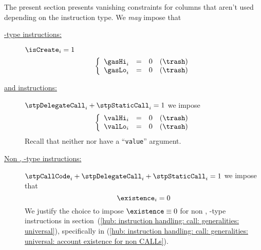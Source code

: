 The present section presents vanishing constraints for columns that aren't used depending on the instruction type. We \emph{may} impose that
\begin{description}
	\item[\underline{-type instructions:}] \If $\isCreate_{i} = 1$ \Then
		\[
			\left\{\begin{array}{lclr}
				\gasHi     _{i} & = & 0 & (\trash) \\
				\gasLo     _{i} & = & 0 & (\trash) \\
			\end{array}\right.
		\]
	\item[\underline{ and  instructions:}]
		\If $\stpDelegateCall _{i} + \stpStaticCall _{i} = 1$
		\Then we impose
		\[
			\left\{\begin{array}{lclr}
				\valHi _{i} & = & 0 & (\trash) \\
				\valLo _{i} & = & 0 & (\trash) \\
			\end{array}\right.
		\]
		\saNote{}
		Recall that neither  nor  have a ``\texttt{value}'' argument.
	\item[\underline{Non , -type instructions:}]
		\If $\stpCallCode _{i} + \stpDelegateCall _{i} + \stpStaticCall _{i} = 1$
		\Then we impose that
		\[ \existence _{i} = 0 \]
		\saNote{}
		We justify the choice to impose $\existence \equiv 0$ for non , -type instructions in
		section~(\ref{hub: instruction handling: call: generalities: universal}),
		specifically in (\ref{hub: instruction handling: call: generalities: universal: account existence for non CALLs}).
\end{description}
